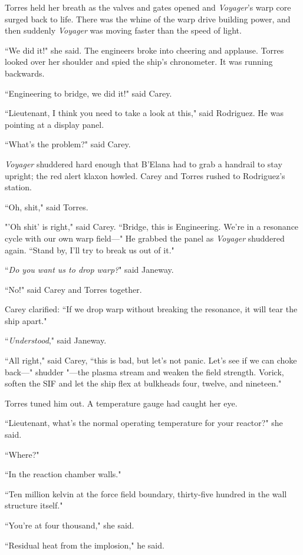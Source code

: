 \documentclass[twoside,letterpaper,12pt]{memoir}
\begin{document}
Torres held her breath as the valves and gates opened and \textit{Voyager}'s warp core surged back to life. There was the whine of the warp drive building power, and then suddenly \textit{Voyager} was moving faster than the speed of light.

``We did it!" she said. The engineers broke into cheering and applause. Torres looked over her shoulder and spied the ship's chronometer. It was running backwards.

``Engineering to bridge, we did it!" said Carey.

``Lieutenant, I think you need to take a look at this," said Rodriguez. He was pointing at a display panel.

``What's the problem?" said Carey.

\textit{Voyager} shuddered hard enough that B'Elana had to grab a handrail to stay upright; the red alert klaxon howled. Carey and Torres rushed to Rodriguez's station.

``Oh, shit," said Torres.

"'Oh shit' is right," said Carey. ``Bridge, this is Engineering. We're in a resonance cycle with our own warp field---" He grabbed the panel as \textit{Voyager} shuddered again. ``Stand by, I'll try to break us out of it."

``\textit{Do you want us to drop warp?}" said Janeway.

``No!" said Carey and Torres together.

Carey clarified: ``If we drop warp without breaking the resonance, it will tear the ship apart."

``\textit{Understood}," said Janeway.

``All right," said Carey, ``this is bad, but let's not panic. Let's see if we can choke back---" shudder "---the plasma stream and weaken the field strength. Vorick, soften the SIF and let the ship flex at bulkheads four, twelve, and nineteen."

Torres tuned him out. A temperature gauge had caught her eye.

``Lieutenant, what's the normal operating temperature for your reactor?" she said.

``Where?"

``In the reaction chamber walls."

``Ten million kelvin at the force field boundary, thirty-five hundred in the wall structure itself."

``You're at four thousand," she said.

``Residual heat from the implosion," he said.
\end{document}
